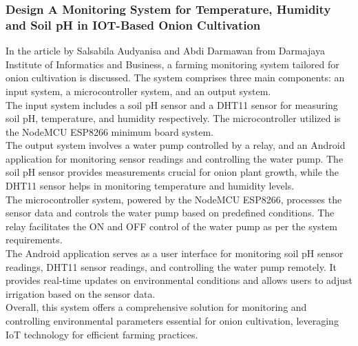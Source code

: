 \documentclass[12pt, a4paper]{article}
\begin{document}
\subsubsection{Design A Monitoring System for Temperature, Humidity and Soil pH in IOT-Based Onion Cultivation}
In the article by Salsabila Audyanisa and Abdi Darmawan \cite{audyanisa2024design} from Darmajaya Institute of Informatics and Business, a farming monitoring system tailored for onion cultivation is discussed. The system comprises three main components: an input system, a microcontroller system, and an output system.\\
The input system includes a soil pH sensor and a DHT11 sensor for measuring soil pH, temperature, and humidity respectively. The microcontroller utilized is the NodeMCU ESP8266 minimum board system.\\
The output system involves a water pump controlled by a relay, and an Android application for monitoring sensor readings and controlling the water pump. The soil pH sensor provides measurements crucial for onion plant growth, while the DHT11 sensor helps in monitoring temperature and humidity levels.\\
The microcontroller system, powered by the NodeMCU ESP8266, processes the sensor data and controls the water pump based on predefined conditions. The relay facilitates the ON and OFF control of the water pump as per the system requirements.\\
The Android application serves as a user interface for monitoring soil pH sensor readings, DHT11 sensor readings, and controlling the water pump remotely. It provides real-time updates on environmental conditions and allows users to adjust irrigation based on the sensor data.\\
Overall, this system offers a comprehensive solution for monitoring and controlling environmental parameters essential for onion cultivation, leveraging IoT technology for efficient farming practices.
\end{document}
